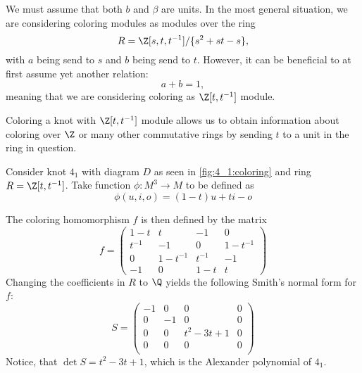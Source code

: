 We must assume that both $b$ and $\beta$ are units. In the most general situation, we are considering coloring modules as modules over the ring
$$R=\Z[s, t, t^{-1}]/\{s^2+st-s\},$$
with $a$ being send to $s$ and $b$ being send to $t$. However, it can be beneficial to at first assume yet another relation: 
$$a+b=1,$$
meaning that we are considering coloring as $\Z[t, t^{-1}]$ module.

Coloring a knot with $\Z[t, t^{-1}]$ module allows us to obtain information about coloring over $\Z$ or many other commutative rings by sending $t$ to a unit in the ring in question.

\begin{example}\label{ex3}
  Consider knot $4_1$ with diagram $D$ as seen in \cref{fig:4_1:coloring} and ring $R=\Z[t, t^{-1}]$. Take function $\phi:M^3\to M$ to be defined as
  $$\phi(u, i, o)=(1-t)u+ti-o$$

  The coloring homomorphism $f$ is then defined by the matrix
  $$
  f=\begin{pmatrix}
    1-t & t & -1 & 0 \\
    t^{-1} & -1 & 0 & 1-t^{-1}\\
    0 & 1-t^{-1} & t^{-1} & -1\\
    -1 & 0 & 1-t & t
  \end{pmatrix}
  $$
  Changing the coefficients in $R$ to $\Q$ yields the following Smith's normal form for $f$:
  $$
  S=\begin{pmatrix}
    -1 & 0 & 0 & 0 \\
    0 & -1 & 0 & 0\\
    0 & 0 & t^2-3t+1 & 0\\
    0 & 0 & 0 & 0\\
  \end{pmatrix}
  $$
  Notice, that $\det S=t^2-3t+1$, which is the Alexander polynomial of $4_1$.

  \begin{figure}[h]\centering
\end{figure}
\end{example}
